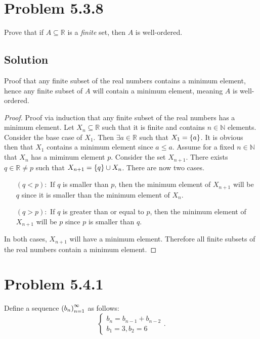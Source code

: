 \documentclass[12pt]{extarticle}
\begin{document}
\section*{Problem 5.3.8}

Prove that if $A \subseteq \mathbb{R}$ is a \textit{finite} set, then $A$ is well-ordered.

\subsection*{Solution}

Proof that any finite subset of the real numbers contains a minimum element, hence any finite subset of $A$ will contain a minimum element, meaning $A$ is well-ordered.

\begin{proof}
	Proof via induction that any finite subset of the real numbers has a minimum element. Let $X_n \subseteq \mathbb{R}$ such that it is finite and contains $n \in \mathbb{N}$ elements. Consider the base case of $X_1$. Then $\exists a \in \mathbb{R}$ such that $X_1 = \qty{a}$. It is obvious then that $X_1$ contains a minimum element since $a \leq a$. Assume for a fixed $n \in \mathbb{N}$ that $X_n$ has a miminum element $p$. Consider the set $X_{n+1}$. There exists $q \in \mathbb{R} \neq p$ such that $X_{n+1} = \qty{q} \cup X_n$. There are now two cases.
	\begin{enumerate}[leftmargin=2cm]
		\item[$(q < p):$] If $q$ is smaller than $p$, then the minimum element of $X_{n+1}$ will be $q$ since it is smaller than the minimum element of $X_{n}$.
		\item[$(q > p):$] If $q$ is greater than or equal to $p$, then the minimum element of $X_{n+1}$ will be $p$ since $p$ is smaller than $q$.
	\end{enumerate}
	In both cases, $X_{n+1}$ will have a minimum element. Therefore all finite subsets of the real numbers contain a minimum element.
\end{proof}

\section*{Problem 5.4.1}

Define a sequence $\qty(b_n)_{n=1}^{\infty}$ as follows:
\[
\begin{cases}
	b_n = b_{n-1} + b_{n-2} \\
	b_1 = 3, b_2 = 6
\end{cases}
.\]
\end{document}

